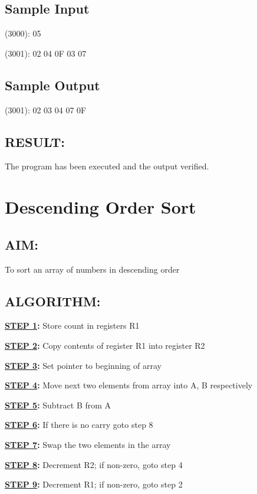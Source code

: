 \documentclass[a4paper,28pt,twoside,openright]{report}
\begin{document}
\section*{Sample Input}
(3000): 05

(3001): 02
 04
 0F
 03
 07

\section*{Sample Output}
(3001): 02 
 03 
 04
 07
 0F

\section*{RESULT:}
The program has been executed and the output verified.
%
%
\chapter{Descending Order Sort}
%
%
\section*{AIM:}
To sort an array of numbers in descending order

\section*{ALGORITHM:}
\textbf{\underline{STEP 1}:} Store count in registers R1

\textbf{\underline{STEP 2}:} Copy contents of register R1 into register R2

\textbf{\underline{STEP 3}:} Set pointer to beginning of array 

\textbf{\underline{STEP 4}:} Move next two elements from array into A, B respectively

\textbf{\underline{STEP 5}:} Subtract B from A

\textbf{\underline{STEP 6}:} If there is no carry goto step 8

\textbf{\underline{STEP 7}:} Swap the two elements in the array

\textbf{\underline{STEP 8}:} Decrement R2; if non-zero, goto step 4

\textbf{\underline{STEP 9}:} Decrement R1; if non-zero, goto step 2  
\end{document}
